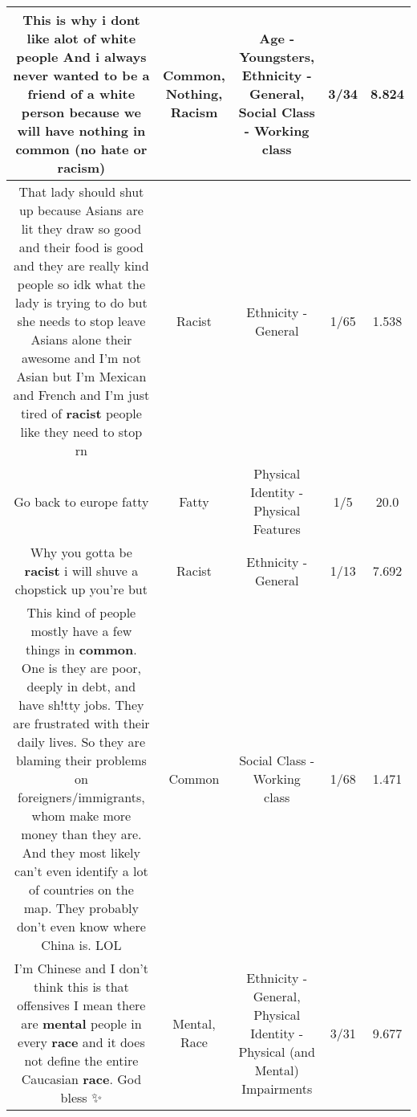 \documentclass[11pt]{article}
\newlength\mylength
\begin{document}
\begin{center}
\begin{longtable}{|C{.65\mylength}|C{.30\mylength}|C{.12\mylength}|C{.12\mylength}|C{.12\mylength}|}
  \small This is why i dont like alot of white people And i always never wanted to be a friend of a white person because we will have \textbf{nothing} in \textbf{common} (no hate or \textbf{racism})\normalsize   & Common, Nothing, Racism & Age - Youngsters, Ethnicity - General, Social Class - Working class & 3/34 & 8.824 \\  \hline
  \small That lady should shut up because Asians are lit they draw so good and their food is good and they are really kind people so idk what the lady is trying to do but she needs to stop leave Asians alone their awesome and I'm not Asian but I'm Mexican and French and I'm just tired of \textbf{racist} people like they need to stop rn\normalsize   & Racist & Ethnicity - General & 1/65 & 1.538 \\  \hline
  \small Go back to europe fatty\normalsize   & Fatty & Physical Identity - Physical Features & 1/5 & 20.0 \\  \hline
  \small Why you gotta be \textbf{racist} i will shuve a chopstick up you're but\normalsize   & Racist & Ethnicity - General & 1/13 & 7.692 \\  \hline
  \small This kind of people mostly have a few things in \textbf{common}. One is they are poor, deeply in debt, and have sh!tty jobs. They are frustrated with their daily lives. So they are blaming their problems on foreigners/immigrants, whom make more money than they are. And they most likely can't even identify a lot of countries on the map. They probably don't even know where China is. LOL\normalsize   & Common & Social Class - Working class & 1/68 & 1.471 \\  \hline
  \small I'm Chinese and I don't think this is that offensives I mean there are \textbf{mental} people in every \textbf{race} and it does not define the entire Caucasian \textbf{race}. God bless ✨\normalsize   & Mental, Race & Ethnicity - General, Physical Identity - Physical (and Mental) Impairments & 3/31 & 9.677 \\  \hline

\end{longtable}
\end{center}
\end{document}
